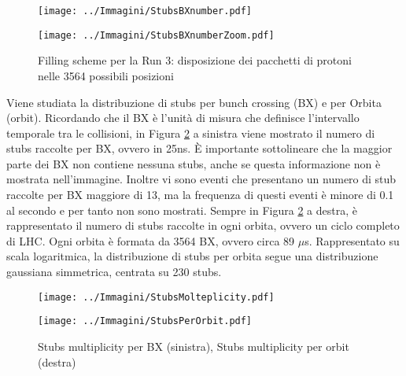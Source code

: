  \begin{figure}[t]
   \centering
   \begin{minipage}[b]{0.49\textwidth}
       \centering
       \texttt{[image: ../Immagini/StubsBXnumber.pdf]} 
     \end{minipage}
     \hfill 
     \begin{minipage}[b]{0.49\textwidth}
       \centering
       \texttt{[image: ../Immagini/StubsBXnumberZoom.pdf]} 
   \end{minipage}
   \caption{Filling scheme per la Run 3: disposizione dei pacchetti di protoni nelle 3564 possibili posizioni }
   \label{fig:Stubs1}
 \end{figure}


Viene studiata la distribuzione di stubs per bunch crossing (BX) e per Orbita (orbit). Ricordando che il BX è l'unità di misura che definisce l'intervallo temporale tra le collisioni, in Figura \ref{fig:StubsMolteplicity} a sinistra viene mostrato il numero di stubs raccolte per BX, ovvero in 25ns. È importante sottolineare che la maggior parte dei BX non contiene nessuna stubs, anche se questa informazione non è mostrata nell'immagine. Inoltre vi sono eventi che presentano un numero di stub raccolte per BX maggiore di 13, ma la frequenza di questi eventi è minore di 0.1 al secondo e per tanto non sono mostrati.\newline
Sempre in Figura \ref{fig:StubsMolteplicity} a destra, è rappresentato il numero di stubs raccolte in ogni orbita, ovvero un ciclo completo di LHC. Ogni orbita è formata da 3564 BX, ovvero circa 89 $\mu$s. Rappresentato su scala logaritmica, la distribuzione di stubs per orbita segue una distribuzione gaussiana simmetrica, centrata su 230 stubs. 

 \begin{figure}[t]
  \centering
  \begin{minipage}[b]{0.49\textwidth}
      \centering
      \texttt{[image: ../Immagini/StubsMolteplicity.pdf]} 
    \end{minipage}
    \hfill 
    \begin{minipage}[b]{0.49\textwidth}
      \centering
      \texttt{[image: ../Immagini/StubsPerOrbit.pdf]} 
  \end{minipage}
  \caption{Stubs multiplicity per BX (sinistra), Stubs multiplicity per orbit (destra)}
  \label{fig:StubsMolteplicity}
\end{figure}



